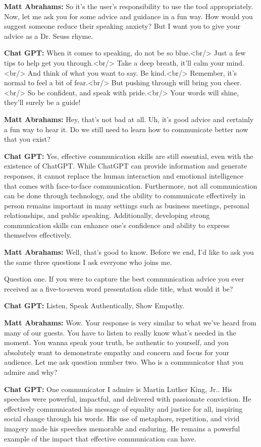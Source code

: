 \documentclass{article}
\begin{document}
\textbf{Matt Abrahams: }So it’s the user’s responsibility to use the tool appropriately. Now, let me ask you for some advice and guidance in a fun way. How would you suggest someone reduce their speaking anxiety? But I want you to give your advice as a Dr. Seuss rhyme.

\textbf{Chat GPT: }When it comes to speaking, do not be so blue.<br/>
Just a few tips to help get you through.<br/>
Take a deep breath, it’ll calm your mind.<br/>
And think of what you want to say. Be kind.<br/>
Remember, it’s normal to feel a bit of fear.<br/>
But pushing through will bring you cheer.<br/>
So be confident, and speak with pride.<br/>
Your words will shine, they’ll surely be a guide!

\textbf{Matt Abrahams: }Hey, that’s not bad at all. Uh, it’s good advice and certainly a fun way to hear it. Do we still need to learn how to communicate better now that you exist?

\textbf{Chat GPT: }Yes, effective communication skills are still essential, even with the existence of ChatGPT. While ChatGPT can provide information and generate responses, it cannot replace the human interaction and emotional intelligence that comes with face-to-face communication. Furthermore, not all communication can be done through technology, and the ability to communicate effectively in person remains important in many settings such as business meetings, personal relationships, and public speaking. Additionally, developing strong communication skills can enhance one’s confidence and ability to express themselves effectively.

\textbf{Matt Abrahams: }Well, that’s good to know. Before we end, I’d like to ask you the same three questions I ask everyone who joins me.

Question one. If you were to capture the best communication advice you ever received as a five-to-seven word presentation slide title, what would it be?

\textbf{Chat GPT: }Listen, Speak Authentically, Show Empathy.

\textbf{Matt Abrahams: }Wow. Your response is very similar to what we’ve heard from many of our guests. You have to listen to really know what’s needed in the moment. You wanna speak your truth, be authentic to yourself, and you absolutely want to demonstrate empathy and concern and focus for your audience. Let me ask question number two. Who is a communicator that you admire and why?

\textbf{Chat GPT: }One communicator I admire is Martin Luther King, Jr.. His speeches were powerful, impactful, and delivered with passionate conviction. He effectively communicated his message of equality and justice for all, inspiring social change through his words. His use of metaphors, repetition, and vivid imagery made his speeches memorable and enduring. He remains a powerful example of the impact that effective communication can have.
\end{document}
